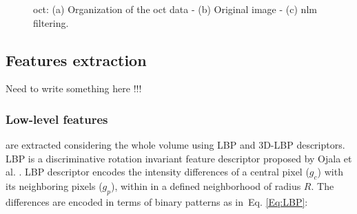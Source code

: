 \begin{figure}
  \centering
  \hspace*{\fill}
   \hfill
   \hfill
  \hspace*{\fill}
  \caption{\ac{oct}: (a) Organization of the \ac{oct} data - (b) Original image - (c) \ac{nlm} filtering.}
  \label{fig:denoise}
\end{figure}

\subsection{Features extraction}
Need to write something here !!!


\subsubsection{Low-level features} are extracted considering the whole volume using LBP and 3D-LBP descriptors. 
LBP is a discriminative rotation invariant feature descriptor proposed by Ojala et al. \cite{ojala2002multiresolution}. 
LBP descriptor encodes the intensity differences of a central pixel ($g_c$) with its neighboring pixels ($g_{p}$), within in a defined neighborhood of radius $R$. The differences are encoded in terms of binary patterns as in~Eq. \ref{Eq:LBP}: 

